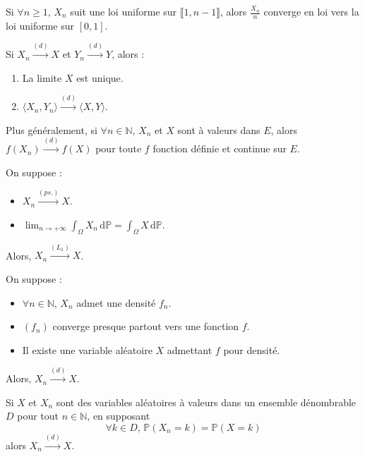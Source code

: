 
  \begin{example}
    Si $\forall n \geq 1$, $X_n$ suit une loi uniforme sur $\llbracket 1, n-1 \rrbracket$, alors $\frac{X_n}{n}$ converge en loi vers la loi uniforme sur $[0,1]$.
  \end{example}


  \begin{proposition}
    Si $X_n \overset{(d)}{\longrightarrow} X$ et $Y_n \overset{(d)}{\longrightarrow} Y$, alors :
    \begin{enumerate}[label=(\roman*)]
      \item La limite $X$ est unique.
      \item $\langle X_n, Y_n \rangle \overset{(d)}{\longrightarrow} \langle X, Y \rangle$.
    \end{enumerate}
    Plus généralement, si $\forall n \in \mathbb{N}$, $X_n$ et $X$ sont à valeurs dans $E$, alors $f(X_n) \overset{(d)}{\longrightarrow} f(X)$ pour toute $f$ fonction définie et continue sur $E$.
  \end{proposition}

  \begin{theorem}
    On suppose :
    \begin{itemize}
      \item $X_n \overset{(ps.)}{\longrightarrow} X$.
      \item $\lim_{n \rightarrow +\infty} \int_\Omega X_n \, \mathrm{d}\mathbb{P} = \int_\Omega X \, \mathrm{d}\mathbb{P}$.
    \end{itemize}
    Alors, $X_n \overset{(L_1)}{\longrightarrow} X$.
  \end{theorem}

  \begin{corollary}
    On suppose :
    \begin{itemize}
      \item $\forall n \in \mathbb{N}$, $X_n$ admet une densité $f_n$.
      \item $(f_n)$ converge presque partout vers une fonction $f$.
      \item Il existe une variable aléatoire $X$ admettant $f$ pour densité.
    \end{itemize}
    Alors, $X_n \overset{(d)}{\longrightarrow} X$.
  \end{corollary}

  \begin{corollary}
    Si $X$ et $X_n$ sont des variables aléatoires à valeurs dans un ensemble dénombrable $D$ pour tout $n \in \mathbb{N}$, en supposant
    \[ \forall k \in D, \, \mathbb{P}(X_n = k) = \mathbb{P}(X = k) \]
    alors $X_n \overset{(d)}{\longrightarrow} X$.
  \end{corollary}

